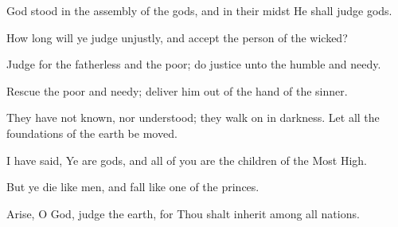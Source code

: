 God stood in the assembly of the gods, and in their midst He shall judge gods.

How long will ye judge unjustly, and accept the person of the wicked?

Judge for the fatherless and the poor; do justice unto the humble and needy.

Rescue the poor and needy; deliver him out of the hand of the sinner.

They have not known, nor understood; they walk on in darkness. Let all the foundations of the earth be moved.

I have said, Ye are gods, and all of you are the children of the Most High.

But ye die like men, and fall like one of the princes.

Arise, O God, judge the earth, for Thou shalt inherit among all nations.
